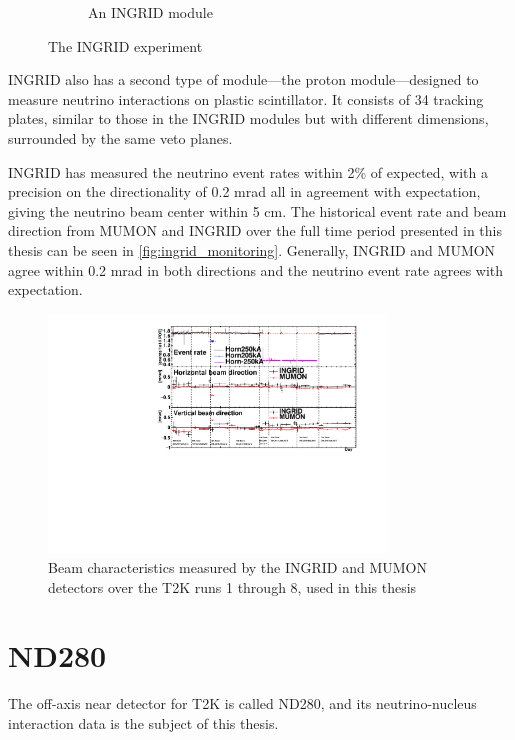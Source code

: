 \begin{figure}[h]
\begin{subfigure}[t]{0.47\textwidth}
		\caption{An INGRID module}
	\end{subfigure}
	\caption{The INGRID experiment}
	\label{fig:ingrid_det}
\end{figure}
INGRID also has a second type of module---the proton module\cite{t2k_ingrid_proton}---designed to measure neutrino interactions on plastic scintillator. It consists of 34 tracking plates, similar to those in the INGRID modules but with different dimensions, surrounded by the same veto planes.

INGRID has measured the neutrino event rates within 2\% of expected, with a precision on the directionality of 0.2 mrad all in agreement with expectation\cite{t2k_2015}, giving the neutrino beam center within 5 cm. The historical event rate and beam direction from MUMON and INGRID over the full time period presented in this thesis can be seen in \autoref{fig:ingrid_monitoring}. Generally, INGRID and MUMON agree within 0.2 mrad in both directions and the neutrino event rate agrees with expectation.
\begin{figure}[h]
	\includegraphics[width=0.8\textwidth, trim={0mm 0mm 0mm 0mm}, clip,page=1]{figures/det_chap/ingrid/INGRID_official_plot_until74}
	\caption{Beam characteristics measured by the INGRID and MUMON detectors over the T2K runs 1 through 8, used in this thesis}
	\label{fig:ingrid_monitoring}
\end{figure}

\section{ND280}
\label{sec:nd280}
The off-axis near detector for T2K is called ND280, and its neutrino-nucleus interaction data is the subject of this thesis. 

